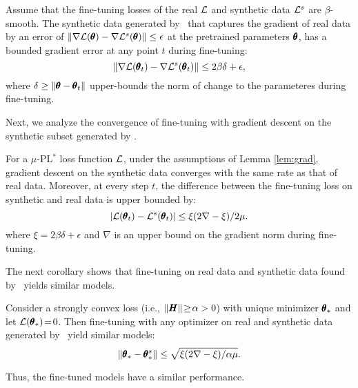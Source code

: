 \begin{lemma}\label{lem:grad}
    Assume that the fine-tuning losses of the real ${\mathcal{L}}$ and synthetic data ${\mathcal{L}}^s$ are $\beta$-smooth. The synthetic data generated by \alg\ that captures the gradient of real data by an error of $\|\nabla {\mathcal{L}}(\pmb{\theta})-\nabla {\mathcal{L}}^s(\pmb{\theta})\|\leq\epsilon$ at the pretrained parameters $\pmb{\theta}$, has a bounded gradient error at any point $t$ during fine-tuning:
    \begin{equation}
        \|\nabla {\mathcal{L}}({\pmb{\theta}_t}) - \nabla {\mathcal{L}}^s({\pmb{\theta}_t})\| \leq 2\beta \delta + \epsilon, 
    \end{equation}
    where $\delta\geq\|\pmb{\theta} - {\pmb{\theta}_t}\|$ upper-bounds the norm of change to the parameteres during fine-tuning.
\end{lemma}
Next, we analyze the convergence of fine-tuning with gradient descent on the synthetic subset generated by \alg.
\begin{theorem}\label{thm:convergence}
    For a $\mu$-PL$^*$ loss function ${\mathcal{L}}$, under the assumptions of Lemma \ref{lem:grad}, 
    gradient descent on the synthetic data converges with the same rate as that of real data. Moreover, at every step $t$, the difference between the fine-tuning loss on synthetic and real data is upper bounded by: 
    \begin{equation}
        |{\mathcal{L}}(\pmb{\theta}_t)-{\mathcal{L}}^s(\pmb{\theta}_{t})|\leq {\xi(2\nabla - \xi)}/{2\mu}.\label{eq:convergence}
    \end{equation}
    where $\xi=2\beta \delta + \epsilon$ %
    and $\nabla$ is an upper bound on the gradient norm during fine-tuning.
\end{theorem}
%
The next corollary shows that fine-tuning on real data and synthetic data found by \alg\ yields similar models. 
\begin{corollary}\label{col:params}
    Consider a strongly convex loss (i.e., $\|\pmb{H}\|\!\geq\!\alpha>0$) with unique minimizer $\pmb{\theta}_*$ %
    and let ${\mathcal{L}}(\pmb{\theta}_*)\!=\!0$. Then fine-tuning with any optimizer on real and synthetic data generated by \alg\ yield similar models: %
    \begin{equation}
        \|\pmb{\theta}_*-\pmb{\theta}_*^s\|\leq \sqrt{  \xi(2 \nabla - \xi)/\alpha \mu }.
    \end{equation}
\end{corollary}
Thus, the fine-tuned models have a similar performance. 

